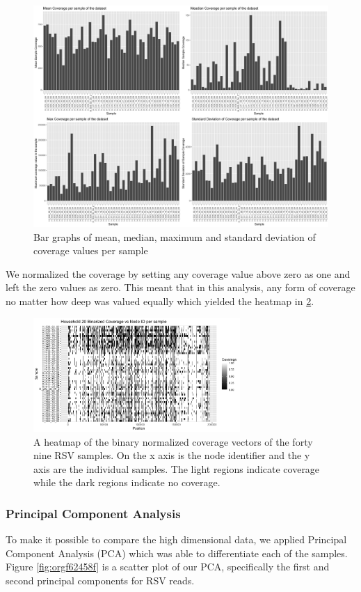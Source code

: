 \documentclass[10pt, a4paper]{article}
\begin{document}
\begin{figure}[h]
\centering
\includegraphics[width=.9\linewidth]{../Figures/RSV/structure_of_coverage_data.png}
\caption[RSV Structure of the Data]{\label{fig:org06d9f6b}
Bar graphs of mean, median, maximum and standard deviation of coverage values per sample}
\end{figure}


We normalized the coverage by setting any coverage value above zero as one and 
left the zero values as zero. This meant that in this analysis, any form of
coverage no matter how deep was valued equally which yielded the heatmap in
\ref{fig:orgcfdf23d}.

\begin{figure}[h!]
\centering
\includegraphics[width=0.7\textwidth]{../Figures/RSV/Heatmap.png}
\caption[RSV heatmap]{\label{fig:orgcfdf23d}
A heatmap of the binary normalized coverage vectors of the forty nine RSV samples. On the x axis is the node identifier and the y axis are the individual samples. The light regions indicate coverage while the dark regions indicate no coverage.}
\end{figure}

\newpage
\subsubsection{Principal Component Analysis}
\label{sec:org3e78a9f}
To make it possible to compare the high dimensional data, we applied Principal 
Component Analysis (PCA) which was able to differentiate each of the samples.
Figure \ref{fig:orgf62458f} is a scatter plot of our PCA, specifically the first and 
second principal components for RSV reads.
\end{document}
